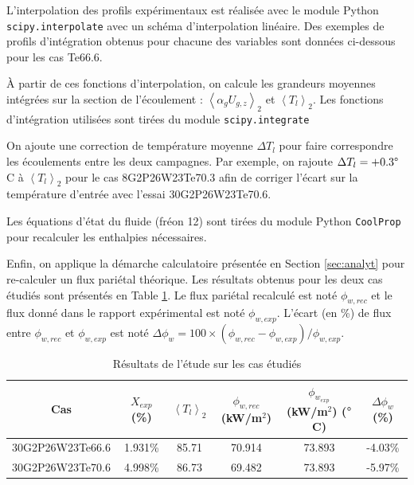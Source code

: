 L'interpolation des profils expérimentaux est réalisée avec le module Python \texttt{scipy.interpolate} avec un schéma d'interpolation linéaire. Des exemples de profils d'intégration obtenus pour chacune des variables sont données ci-dessous pour les cas Te66.6.

%
%
%
%
%
%
%


\`A partir de ces fonctions d'interpolation, on calcule les grandeurs moyennes intégrées sur la section de l'écoulement : $\left<\alpha_{g}U_{g,z}\right>_{2}$ et $\left<T_{l}\right>_{2}$. Les fonctions d'intégration utilisées sont tirées du module \texttt{scipy.integrate} 

\npar
On ajoute une correction de température moyenne $\Delta T_{l}$ pour faire correspondre les écoulements entre les deux campagnes. Par exemple, on rajoute $\Delta T_{l} = +0.3\degree$ C à $\left<T_{l}\right>_{2}$ pour le cas 8G2P26W23Te70.3 afin de corriger l'écart sur la température d'entrée avec l'essai 30G2P26W23Te70.6.

\npar 

Les équations d'état du fluide (fréon 12) sont tirées du module Python \texttt{CoolProp} pour recalculer les enthalpies nécessaires.


Enfin, on applique la démarche calculatoire présentée en Section \ref{sec:analyt} pour re-calculer un flux pariétal théorique. Les résultats obtenus pour les deux cas étudiés sont présentés en Table \ref{tab:resu}. Le flux pariétal recalculé est noté $\phi_{w,rec}$ et le flux donné dans le rapport expérimental est noté $\phi_{w,exp}$. L'écart (en \%) de flux entre $\phi_{w,rec}$ et $\phi_{w,exp}$ est noté $\Delta \phi_{w}=100 \times (\phi_{w,rec}-\phi_{w,exp})/\phi_{w,exp}$.

\begin{table}[!h]
\label{tab:resu}
\centering

\begin{tabular}{|c||c|c|c|c|c|}
\hline
Cas & $X_{exp}$ (\%) & $\left<T_{l}\right>_{2}$ & $\phi_{w,rec}$ (kW/m$^{2}$) & $\phi_{w_{exp}}$ (kW/m$^{2}$)  ($\degree$C) & $\Delta \phi_{w}$ (\%)  \\
\hline
\hline
30G2P26W23Te66.6 & 1.931\% & 85.71 & 70.914 & 73.893 & -4.03\%\\
\hline
\hline
30G2P26W23Te70.6 & 4.998\% & 86.73 & 69.482 & 73.893 & -5.97\%\\
\hline
\end{tabular}

\caption{Résultats de l'étude sur les cas étudiés}

\end{table}


